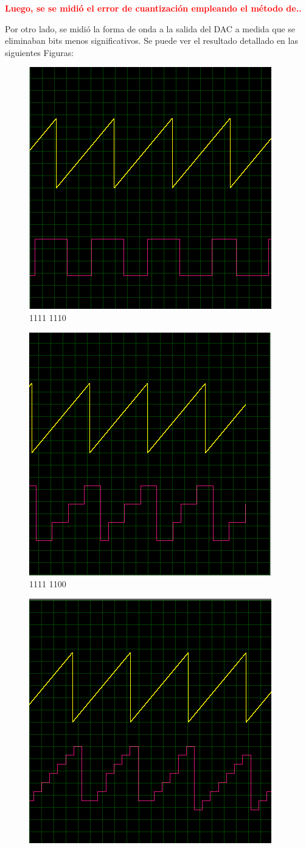 \begin{center}
	\LARGE{\textcolor{red}{\textbf{Luego, se se midió el error de cuantización empleando el método de..}}}
\end{center}

Por otro lado, se midió la forma de onda a la salida del DAC a medida que se eliminaban bits menos significativos. Se puede ver el resultado detallado en las siguientes Figuras:

\newpage

\begin{multicols}{2}
\begin{figure}[H]
\centering
\includegraphics[width=0.5\linewidth]{ImagenesEjercicio1/bit1.png}
\caption{1111 1110}
\end{figure}
\begin{figure}[H]
\centering
\includegraphics[width=0.5\linewidth]{ImagenesEjercicio1/bit2.png}
\caption{1111 1100}
\end{figure}
\begin{figure}[H]
\centering
\includegraphics[width=0.5\linewidth]{ImagenesEjercicio1/bit3.png}

\end{figure}
\end{multicols}
